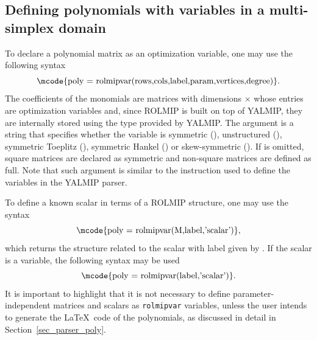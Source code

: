 \documentclass[english,11pt]{article}
\theoremstyle{break} \theorembodyfont{\small\rm}
\begin{document}
%
%
%







\subsection{Defining polynomials with  variables in a multi-simplex domain}

To declare a polynomial matrix as an optimization variable, one may use the following syntax
\[
\mbox{\mcode{poly = rolmipvar(rows,cols,label,param,vertices,degree)}}.
\]
The coefficients of the monomials are matrices with dimensions  $\times$ 
whose entries are optimization variables and, since ROLMIP is built on top of YALMIP, they
are internally stored using the  type provided by YALMIP.
The argument 
is a string that specifies whether the variable is symmetric (),
unstructured (),
symmetric Toeplitz (), symmetric
Hankel () or skew-symmetric ().
If  is omitted, square matrices are declared as symmetric
and non-square matrices are defined as full.
Note that such argument is similar to the  instruction
used to define the variables in the YALMIP parser.

To define a known scalar in terms of a ROLMIP structure, one may use the syntax
\[
\mbox{\mcode{poly = rolmipvar(M,label,'scalar')}},
\]
which returns the structure related to the scalar  with label given by .
If the scalar is a  variable, the following syntax may be used
\[
\mbox{\mcode{poly = rolmipvar(label,'scalar')}}.
\]
It is important to highlight that it is not necessary to define parameter-independent matrices and
scalars as \texttt{rolmipvar} variables, unless the user intends to generate the \LaTeX ~code of the
polynomials, as discussed in detail in Section~\ref{sec_parser_poly}.
\end{document}
